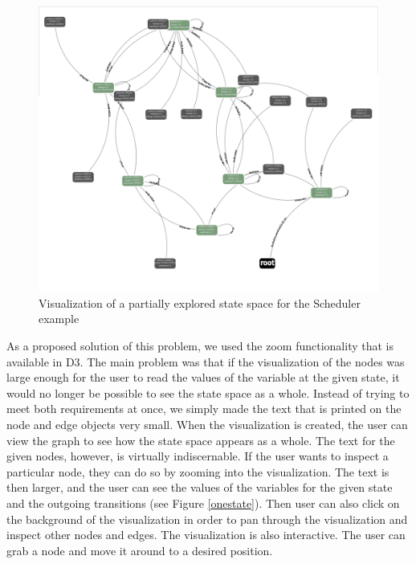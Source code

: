 \begin{center}
\begin{figure}[h!]
\centering
\includegraphics[width=13cm]{bilder/ss.png}
\caption{Visualization of a partially explored state space for the Scheduler example}
\label{zoomedOut}
\end{figure}
\end{center}

As a proposed solution of this problem, we used the zoom functionality that is available in D3. The main problem was that if the visualization of the nodes was large enough for the user to read the values of the variable at the given state, it would no longer be possible to see the state space as a whole. Instead of trying to meet both requirements at once, we simply made the text that is printed on the node and edge objects very small. When the visualization is created, the user can view the graph to see how the state space appears as a whole. The text for the given nodes, however, is virtually indiscernable. If the user wants to inspect a particular node, they can do so by zooming into the visualization. The text is then larger, and the user can see the values of the variables for the given state and the outgoing transitions (see Figure \ref{onestate}). Then user can also click on the background of the visualization in order to pan through the visualization and inspect other nodes and edges. The visualization is also interactive. The user can grab a node and move it around to a desired position.

